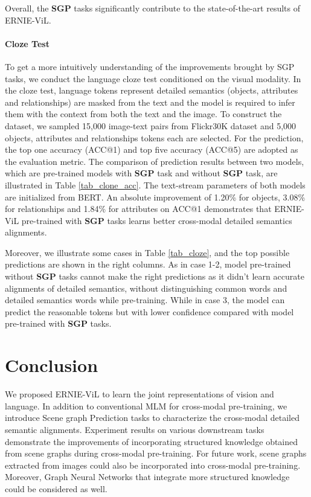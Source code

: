 \documentclass[letterpaper]{article} \usepackage{aaai21}  \usepackage{times}  \usepackage{helvet} \usepackage{courier}  \usepackage[hyphens]{url}  \usepackage{graphicx} \urlstyle{rm} \def\UrlFont{\rm}  \usepackage{natbib}  \usepackage{caption} \frenchspacing  \setlength{\pdfpagewidth}{8.5in}  \setlength{\pdfpageheight}{11in}  \usepackage{cite}
\begin{document}
Overall, the \textbf{SGP} tasks significantly contribute to the state-of-the-art results of ERNIE-ViL.


\paragraph{Cloze Test} To get a more intuitively understanding of the improvements brought by SGP tasks,  we conduct the language cloze test conditioned on the visual modality. In the cloze test, language tokens represent detailed semantics (objects, attributes and relationships) are masked from the text and the model is required to infer them with the context from both the text and the image. To construct the dataset, we sampled 15,000 image-text pairs from Flickr30K dataset and 5,000 objects, attributes and relationships tokens 
each are selected. For the prediction, the top one accuracy (ACC@1) and top five accuracy (ACC@5) are adopted as the evaluation metric. The comparison of  prediction results between two models, which are pre-trained models with \textbf{SGP} task and without \textbf{SGP} task, are illustrated in Table \ref{tab_clone_acc}. 
The text-stream parameters of both models are initialized from BERT. An absolute improvement of 1.20\% for objects, 3.08\% for relationships and 1.84\% for attributes on ACC@1 demonstrates that ERNIE-ViL pre-trained with \textbf{SGP} tasks learns better cross-modal detailed semantics alignments. 

Moreover, we illustrate some cases in Table \ref{tab_cloze}, and the top  possible predictions are shown in the right columns. As in case 1-2,  model pre-trained without \textbf{SGP} tasks cannot make the right predictions as it didn't learn accurate alignments of detailed semantics, without distinguishing common words and detailed semantics words while pre-training.
While in case 3, the model can predict the reasonable tokens but with lower confidence compared with model pre-trained with \textbf{SGP} tasks. 


\section{Conclusion}

We proposed ERNIE-ViL to learn the joint representations of vision and language. In addition to conventional MLM for cross-modal pre-training, we introduce Scene graph Prediction tasks to characterize the cross-modal detailed semantic alignments. Experiment results on various downstream tasks demonstrate the improvements of incorporating structured knowledge obtained from scene graphs during cross-modal pre-training. For future work, scene graphs extracted from images could also be incorporated into cross-modal pre-training. Moreover, Graph Neural Networks that integrate more structured knowledge could be considered as well.
\end{document}
